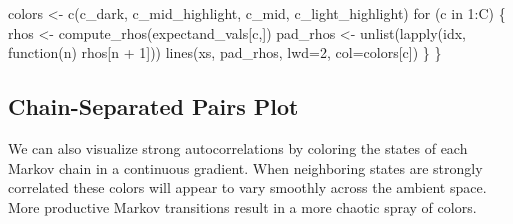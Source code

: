 \documentclass[
  letterpaper,
  DIV=11,
  numbers=noendperiod]{scrartcl}
\newenvironment{Shaded}{\begin{snugshade}}{\end{snugshade}}
\newcommand{\ControlFlowTok}[1]{\textcolor[rgb]{0.00,0.23,0.31}{#1}}
\newcommand{\DecValTok}[1]{\textcolor[rgb]{0.68,0.00,0.00}{#1}}
\newcommand{\KeywordTok}[1]{\textcolor[rgb]{0.00,0.23,0.31}{#1}}
\newcommand{\NormalTok}[1]{\textcolor[rgb]{0.00,0.23,0.31}{#1}}
\newcommand{\OperatorTok}[1]{\textcolor[rgb]{0.37,0.37,0.37}{#1}}
\begin{document}
\begin{Shaded}
\begin{Highlighting}[]
\NormalTok{  colors }\OperatorTok{\textless{}{-}}\NormalTok{ c(c\_dark, c\_mid\_highlight, c\_mid, c\_light\_highlight)}
  \ControlFlowTok{for}\NormalTok{ (c }\KeywordTok{in} \DecValTok{1}\NormalTok{:C) \{}
\NormalTok{    rhos }\OperatorTok{\textless{}{-}}\NormalTok{ compute\_rhos(expectand\_vals[c,])}
\NormalTok{    pad\_rhos }\OperatorTok{\textless{}{-}}\NormalTok{ unlist(lapply(idx, function(n) rhos[n }\OperatorTok{+} \DecValTok{1}\NormalTok{]))}
\NormalTok{    lines(xs, pad\_rhos, lwd}\OperatorTok{=}\DecValTok{2}\NormalTok{, col}\OperatorTok{=}\NormalTok{colors[c])}
\NormalTok{  \}}
\NormalTok{\}}
\end{Highlighting}
\end{Shaded}

\subsection{Chain-Separated Pairs
Plot}\label{chain-separated-pairs-plot}

We can also visualize strong autocorrelations by coloring the states of
each Markov chain in a continuous gradient. When neighboring states are
strongly correlated these colors will appear to vary smoothly across the
ambient space. More productive Markov transitions result in a more
chaotic spray of colors.
\end{document}
